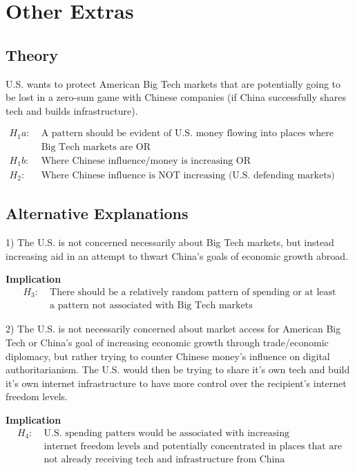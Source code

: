 \section{Other Extras}
\subsection*{Theory} 
U.S. wants to protect American Big Tech markets that are potentially going to be lost in a zero-sum game with Chinese companies (if China successfully shares tech and builds infrastructure).

\begin{align*}
    H_1a:\; & \text{A pattern should be evident of U.S. money flowing into places where either}\\
    & \text{Big Tech markets are OR}\\
    H_1b:\; & \text{Where Chinese influence/money is increasing OR}\\
    H_2:\; & \text{Where Chinese influence is NOT increasing (U.S. defending markets)}
\end{align*}

\subsection*{Alternative Explanations}
1) The U.S. is not concerned necessarily about Big Tech markets, but instead increasing aid in an attempt to thwart China's goals of economic growth abroad.

\textbf{Implication}
\begin{align*}
    H_3:\; & \text{There should be a relatively random pattern of spending or at least}\\
    & \text{a pattern not associated with Big Tech markets}
\end{align*}

2) The U.S. is not necessarily concerned about market access for American Big Tech or China's goal of increasing economic growth through trade/economic diplomacy, but rather trying to counter Chinese money's influence on digital authoritarianism. The U.S. would then be trying to share it's own tech and build it's own internet infrastructure to have more control over the recipient's internet freedom levels.

\textbf{Implication}
\begin{align*}
    H_4:\; & \text{U.S. spending patters would be associated with increasing}\\
    & \text{internet freedom levels and potentially concentrated in places that are}\\
    & \text{not already receiving tech and infrastructure from China}\\
\end{align*}

